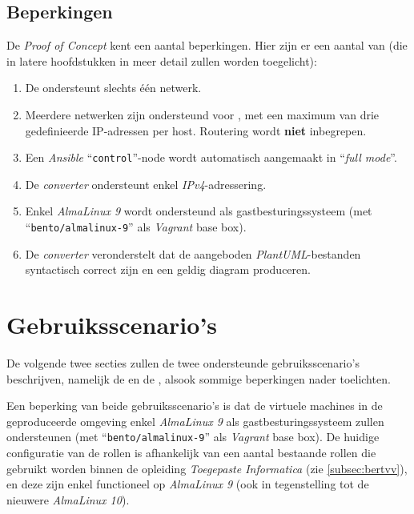 \subsection{Beperkingen}%
\label{subsec:beperkingen_poc}

De \emph{Proof of Concept} kent een aantal beperkingen. Hier zijn er een aantal van (die in latere hoofdstukken in meer detail zullen worden toegelicht):

\begin{enumerate}
  \item De  ondersteunt slechts één netwerk.
  \item Meerdere netwerken zijn ondersteund voor , met een maximum van drie gedefinieerde IP-adressen per host. Routering wordt \textbf{niet} inbegrepen.
  \item Een \emph{Ansible} ``\texttt{control}''-node wordt automatisch aangemaakt in ``\emph{full mode}''.
  \item De \emph{converter} ondersteunt enkel \emph{IPv4}-adressering.
  \item Enkel \emph{AlmaLinux 9} wordt ondersteund als gastbesturingssysteem (met ``\texttt{bento/almalinux-9}'' als \emph{Vagrant} base box).
  \item De \emph{converter} veronderstelt dat de aangeboden \emph{PlantUML}-bestanden syntactisch correct zijn en een geldig diagram produceren.
\end{enumerate}

\section{Gebruiksscenario's}%
\label{sec:gebruiksscenarios}

De volgende twee secties zullen de twee ondersteunde gebruiksscenario's beschrijven, namelijk de  en de , alsook sommige beperkingen nader toelichten.

Een beperking van beide gebruiksscenario's is dat de virtuele machines in de geproduceerde omgeving enkel \emph{AlmaLinux 9} als gastbesturingssysteem zullen ondersteunen (met ``\texttt{bento/almalinux-9}'' als \emph{Vagrant} base box). De huidige configuratie van de rollen is afhankelijk van een aantal bestaande rollen die gebruikt worden binnen de opleiding \emph{Toegepaste Informatica} (zie \autoref{subsec:bertvv}), en deze zijn enkel functioneel op \emph{AlmaLinux 9} (ook in tegenstelling tot de nieuwere \emph{AlmaLinux 10}).

